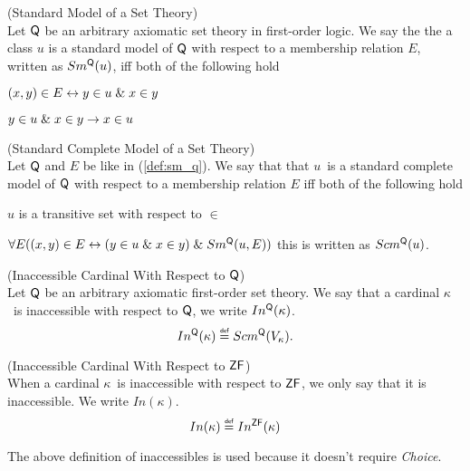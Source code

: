 \begin{definition}{(Standard Model of a Set Theory)}\label{def:sm_q}\\
Let $\sf{Q}$ be an arbitrary axiomatic set theory in first-order logic. We say the the a class $u$ is a standard model of $\sf{Q}$ with respect to a membership relation $E$, written as $Sm^{\sf{Q}}(u)$, iff both of the following hold
\bce[(i)]
\item $(x, y) \in E \leftrightarrow y \in u \mathrel{\&} x \in y$
\item $y \in u \mathrel{\&} x \in y \rightarrow x \in u$
\ece
\end{definition}
\begin{definition}{(Standard Complete Model of a Set Theory)}\label{def:scm_q}\\
Let $\sf{Q}$ and $E$ be like in (\ref{def:sm_q}). We say that that $u$ is a standard complete model of $\sf{Q}$ with respect to a membership relation $E$ iff both of the following hold
\bce[(i)]
\item $u$ is a transitive set with respect to $\in$
\item $\forall E ((x, y) \in E \leftrightarrow (y \in u \mathrel{\&} x \in y) \mathrel{\&} Sm^{\sf{Q}}(u, E))$
\ece
this is written as $Scm^{\sf{Q}}(u)$.
\end{definition}

\begin{definition}{(Inaccessible Cardinal With Respect to $\sf{Q}$)}\label{def:levy_inaccessible_q}\\
Let $\sf{Q}$ be an arbitrary axiomatic first-order set theory. We say that a cardinal $\kappa$ is inaccessible with respect to $\sf{Q}$, we write $In^{\sf{Q}}(\kappa)$.
\begin{equation}
In^{\sf{Q}}(\kappa) \defeq Scm^{\sf{Q}}(V_\kappa).
\end{equation}
\end{definition}

\begin{definition}{(Inaccessible Cardinal With Respect to $\sf{ZF}$)}\label{def:levy_inaccessible}\\
When a cardinal $\kappa$ is inaccessible with respect to $\sf{ZF}$, we only say that it is inaccessible. We write $In(\kappa)$.
\begin{equation}
In(\kappa) \defeq In^{\sf{ZF}}(\kappa)
\end{equation}
\end{definition}
The above definition of inaccessibles is used because it doesn't require \emph{Choice}.

